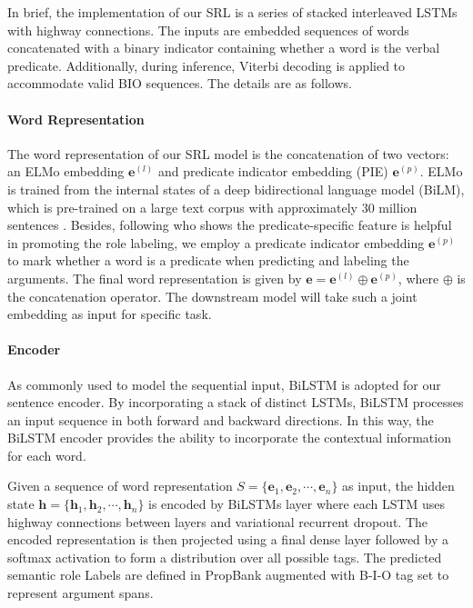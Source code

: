 \documentclass[11pt]{article}
\begin{document}
In brief, the implementation of our SRL is a series of stacked interleaved LSTMs with highway connections. The inputs are embedded sequences of words concatenated with a binary indicator containing whether a word is the verbal predicate. Additionally, during inference, Viterbi decoding is applied to accommodate valid BIO sequences. The details are as follows.

\paragraph{Word Representation}
The word representation of our SRL model is the concatenation of two vectors: an ELMo embedding $\bm{e}^{(l)}$ and predicate indicator embedding (PIE) $\bm{e}^{(p)}$. ELMo is trained from the internal states of a deep bidirectional language model (BiLM), which is pre-trained on a large text corpus with approximately 30
million sentences \citep{Chelba2014One}. Besides, following \citep{li2019dependency} who shows the predicate-specific feature is helpful in promoting the role labeling, we employ a predicate indicator embedding $\bm{e}^{(p)}$ to mark whether a word is a predicate when predicting and labeling the arguments. The final word representation is given by $\bm{e} = \bm{e}^{(l)} \oplus \bm{e}^{(p)}$, where $\oplus$ is the concatenation operator. The downstream model will take such a joint embedding as input for specific task.

\paragraph{Encoder} 
As commonly used to model the sequential input, BiLSTM is adopted for our sentence encoder. By incorporating a stack of distinct LSTMs, BiLSTM processes an input sequence in both forward and backward directions. In this way, the BiLSTM encoder provides the ability to incorporate the contextual information for each word. 

Given a sequence of word representation $S=\{\bm{e}_1, \bm{e}_2, \cdots, \bm{e}_n\}$ as input, the hidden state $\bm{h}=\{\bm{h}_1, \bm{h}_2, \cdots, \bm{h}_n\}$ is encoded by BiLSTMs layer where each LSTM uses highway connections between layers and variational recurrent dropout. The encoded representation is then projected using a final dense layer followed by a softmax activation to form a distribution over all possible tags. The predicted semantic role Labels are defined in PropBank \citep{Palmer2005The} augmented with B-I-O tag set to represent argument spans. 
\end{document}
